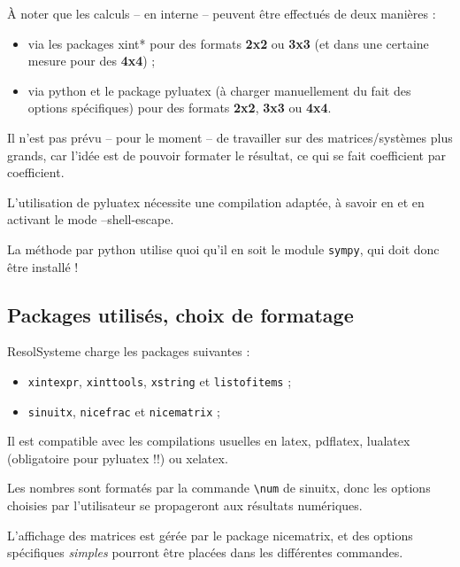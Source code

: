 \documentclass[french,a4paper,11pt]{article}
\begin{document}
\begin{importantblock}
À noter que les calculs -- en interne -- peuvent être effectués de deux manières :

\begin{itemize}
	\item via les packages \textsf{xint*} pour des formats \textbf{2x2} ou \textbf{3x3} (et dans une certaine mesure pour des \textbf{4x4}) ;
	\item via \textsf{python} et le package \textsf{pyluatex} (à charger manuellement du fait des options spécifiques) pour des formats \textbf{2x2}, \textbf{3x3} ou \textbf{4x4}.
\end{itemize}

Il n'est pas prévu -- pour le moment -- de travailler sur des matrices/systèmes plus grands, car l'idée est de pouvoir formater le résultat, ce qui se fait coefficient par coefficient.
\end{importantblock}

\begin{warningblock}
L'utilisation de \textsf{pyluatex} nécessite une compilation adaptée, à savoir en  et en activant le mode \textsf{--shell-escape}. 

\smallskip

La méthode par \textsf{python} utilise quoi qu'il en soit le module \texttt{sympy}, qui doit donc être installé !
\end{warningblock}

\subsection{Packages utilisés, choix de formatage}

\begin{noteblock}
\textsf{ResolSysteme} charge les packages suivantes :

\begin{itemize}
	\item \texttt{xintexpr}, \texttt{xinttools}, \texttt{xstring} et \texttt{listofitems} ;
	\item \texttt{sinuitx}, \texttt{nicefrac} et \texttt{nicematrix} ;
\end{itemize}

Il est compatible avec les compilations usuelles en \textsf{latex}, \textsf{pdflatex}, \textsf{lualatex} (obligatoire pour \textsf{pyluatex} !!) ou \textsf{xelatex}.
\end{noteblock}

\begin{importantblock}
Les nombres sont formatés par la commande \texttt{\textbackslash num} de \textsf{sinuitx}, donc les options choisies par l'utilisateur se propageront aux résultats numériques.

\smallskip

L'affichage des matrices est gérée par le package \textsf{nicematrix}, et des options spécifiques \textit{simples} pourront être placées dans les différentes commandes.
\end{importantblock}
\end{document}
